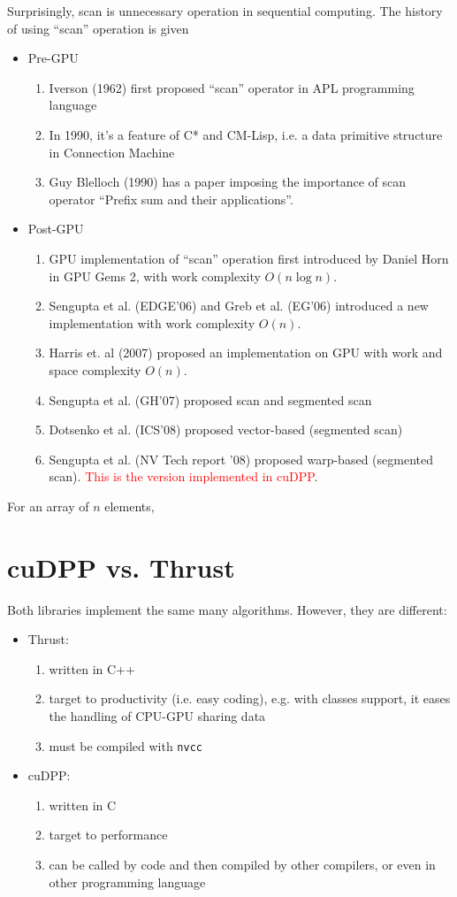 Surprisingly, scan is unnecessary operation in sequential
computing. The history of using ``scan'' operation is given
\begin{itemize}
\item Pre-GPU
\begin {enumerate}
\item Iverson (1962) first proposed ``scan'' operator in APL
  programming language
\item In 1990, it's a feature of C* and CM-Lisp, i.e. a data primitive
  structure in Connection Machine
\item Guy Blelloch (1990) has a paper imposing the importance of scan
  operator ``Prefix sum and their applications''. 
\end{enumerate}
\item Post-GPU
  \begin{enumerate}
  \item GPU implementation of ``scan'' operation first introduced by
    Daniel Horn in GPU Gems 2, with work complexity $O(n\log n)$. 
  \item Sengupta et al. (EDGE'06) and Greb et al. (EG'06) introduced a
    new implementation with work complexity $O(n)$. 
  \item Harris et. al (2007) proposed an implementation on GPU with
    work and space complexity $O(n)$.
  \item Sengupta et al. (GH'07) proposed scan and segmented scan
  \item Dotsenko et al. (ICS'08) proposed vector-based (segmented
    scan) 
  \item Sengupta et al. (NV Tech report '08) proposed warp-based
    (segmented scan). \textcolor{red}{This is the version implemented
      in cuDPP}. 
  \end{enumerate}
\end{itemize}
For an array of $n$ elements, 


\section{cuDPP vs. Thrust}
\label{sec:cudpp-vs.-thrust}

Both libraries implement the same many algorithms. However, they are
different:
\begin{itemize}
\item Thrust: 
  \begin{enumerate}
  \item written in C++
  \item target to productivity (i.e. easy coding), e.g. with classes
    support, it eases the handling of CPU-GPU sharing data
  \item must be compiled with \verb!nvcc!
  \end{enumerate}
\item cuDPP:
  \begin{enumerate}
  \item written in C
  \item target to performance
  \item can be called by code and then compiled by other compilers, or
    even in other programming language
  \end{enumerate}
\end{itemize}

